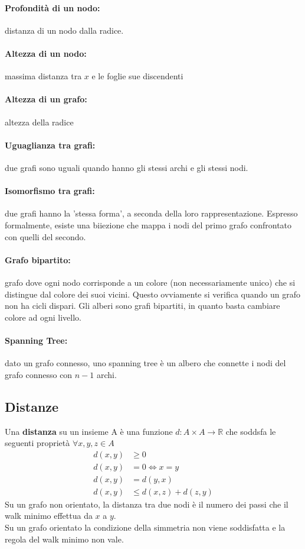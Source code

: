 \documentclass[a4paper,12pt]{article}
\begin{document}
\paragraph{Profondità di un nodo: } distanza di un nodo dalla radice.
\paragraph{Altezza di un nodo: } massima distanza tra $x$ e le foglie sue discendenti
\paragraph{Altezza di un grafo: } altezza della radice
\paragraph{Uguaglianza tra grafi: } due grafi sono uguali quando hanno gli stessi archi e gli stessi nodi.
\paragraph{Isomorfismo tra grafi: } due grafi hanno la 'stessa forma', a seconda della loro rappresentazione. Espresso
formalmente, esiste una biiezione che mappa i nodi del primo grafo confrontato con quelli del secondo.
\paragraph{Grafo bipartito: } grafo dove ogni nodo corrisponde a un colore (non necessariamente unico) che si distingue dal colore dei suoi vicini. Questo
ovviamente si verifica quando un grafo non ha cicli dispari. Gli alberi sono grafi bipartiti, in quanto basta cambiare colore ad ogni livello.
\paragraph{Spanning Tree: } dato un grafo connesso, uno spanning tree è un albero che connette i nodi del grafo connesso con $n-1$ archi.
\subsection{Distanze}
Una \textbf{distanza} su un insieme A è una funzione $d: A\times A \rightarrow \mathbb{R}$ che soddsfa le seguenti proprietà $\forall x,y,z \in A$
\begin{align*}
    d(x,y) &\geq 0\\
    d(x,y) &= 0 \Longleftrightarrow x = y\\
    d(x,y) &= d(y,x)\\
    d(x,y) &\leq d(x,z) + d(z,y)
\end{align*}
Su un grafo non orientato, la distanza tra due nodi è il numero dei passi che il walk minimo effettua da $x$ a $y$.\\
Su un grafo orientato la condizione della simmetria non viene soddisfatta e la regola del walk minimo non vale.
\end{document}
